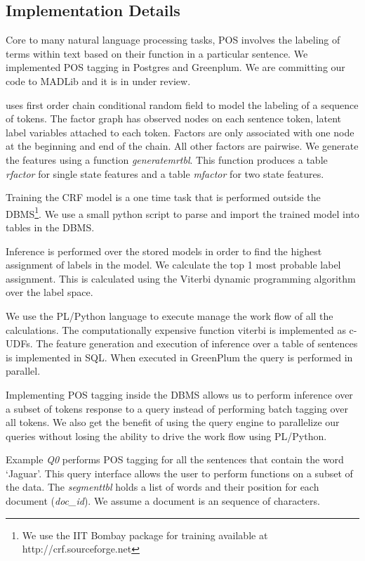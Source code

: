 \subsection{Implementation Details}
\label{sec:impdis}


Core to many natural language processing tasks, POS involves the
labeling of terms within text based on their function in a particular sentence.
We implemented POS tagging in Postgres and Greenplum. We are
committing our code to MADLib and it is in under review.

\system uses first order chain conditional random field to model the labeling
of a sequence of tokens. The factor graph has observed nodes on each sentence
token, latent label variables attached to each token.
Factors are only associated with one node at the beginning and end of the chain.
All other factors are pairwise.  
We generate the features using a function \textit{generatemrtbl}. 
This function produces a table \textit{rfactor} for single state features and a 
table \textit{mfactor} for two state features.

Training the CRF model is a one time task that is performed outside the 
DBMS\footnote{We use the IIT Bombay package for training available at 
http://crf.sourceforge.net }.
We use a small python script to parse and import the trained model into 
tables in the DBMS. 

Inference is performed over the stored models in order to find the highest 
assignment of labels in the model.
We calculate the top 1 most probable label assignment. This is calculated using
the Viterbi dynamic programming algorithm over the label space.


We use the PL/Python language to execute manage the work flow of all the 
calculations.
The computationally expensive function viterbi is implemented as c-UDFs.
The feature generation and execution of inference 
over a table of sentences is implemented in {SQL}. When executed in GreenPlum 
the query is performed in parallel.


Implementing POS tagging inside the DBMS allows us to perform inference over a 
subset of tokens response to a query instead of performing batch tagging over 
all tokens.
We also get the benefit of using the query engine to parallelize our queries
without losing the ability to drive the work flow using PL/Python.


Example \textit{Q0} performs POS tagging for  all the sentences that contain
the word `Jaguar'. This query interface allows the user to perform
functions on a subset of the data.
The \textit{segmenttbl} holds a list of words and their position for each
document (\textit{doc\_id}). We assume a document is an sequence of characters.


